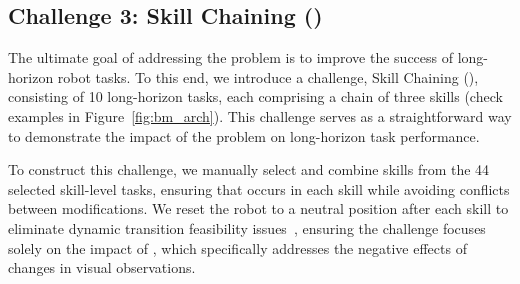\subsection{Challenge 3: Skill Chaining (\bmc)}
\label{subsec:bm_3}
The ultimate goal of addressing the \pb problem is to improve the success of long-horizon robot tasks. To this end, we introduce a challenge, Skill Chaining (\bmc), consisting of 10 long-horizon tasks, each comprising a chain of three skills (check examples in Figure~\ref{fig:bm_arch}). This challenge serves as a straightforward way to demonstrate the impact of the \pb problem on long-horizon task performance.

To construct this challenge, we manually select and combine skills from the 44 selected skill-level tasks, ensuring that \pb occurs in each skill while avoiding conflicts between modifications. We reset the robot to a neutral position after each skill to eliminate dynamic transition feasibility issues~\cite{chen2023sequential}, ensuring the challenge focuses solely on the impact of \pb, which specifically addresses the negative effects of changes in visual observations.


